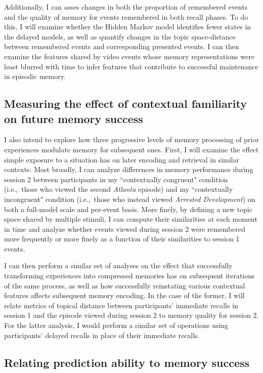 \documentclass{article}
\begin{document}
Additionally, I can asses changes in both the proportion of remembered events and the quality of memory for events remembered in both recall phases.
To do this, I will examine whether the Hidden Markov model identifies fewer states in the delayed models, as well as quantify changes in the topic space-distance between remembered events and corresponding presented events.  I can then examine the features shared by video events whose memory representations were least blurred with time to infer features that contribute to successful maintenance in episodic memory.


\subsection{Measuring the effect of contextual familiarity on future memory success}

I also intend to explore how three progressive levels of memory processing of prior experiences modulate memory for subsequent ones.  First, I will examine the effect simple exposure to a situation has on later encoding and retrieval in similar contexts.  Most broadly, I can analyze differences in memory performance during session 2 between participants in my ``contextually congruent" condition (i.e.,~those who viewed the second \textit{Atlanta} episode) and my ``contextually incongruent" condition (i.e.,~those who instead viewed \textit{Arrested Development}) on both a full-model scale and per-event basis.  More finely, by defining a new topic space shared by multiple stimuli, I can compute their similarities at each moment in time and analyze whether events viewed during session 2 were remembered more frequently or more finely as a function of their similarities to session 1 events.

I can then perform a similar set of analyses on the effect that successfully transforming experiences into compressed memories has on subsequent iterations of the same process, as well as how successfully reinstating various contextual features affects subsequent memory encoding.  In the case of the former, I will relate metrics of topical distance between participants' immediate recalls in session 1 and the episode viewed during session 2 to memory quality for session 2. For the latter analysis, I would perform a similar set of operations using participants' delayed recalls in place of their immediate recalls.


\subsection{Relating prediction ability to memory success}
\end{document}
